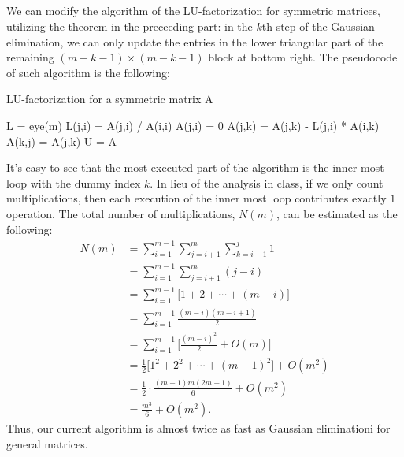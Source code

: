 \documentclass[11pt]{article}
\begin{document}
\subsection{}
We can modify the algorithm of the LU-factorization for symmetric matrices, utilizing the theorem in the preceeding part: in the $k$th step of the Gaussian elimination, we can only update the entries in the lower triangular part of the remaining $(m-k-1)\times(m-k-1)$ block at bottom right. The pseudocode of such algorithm is the following:
\begin{algorithm}[H]
\caption{LU-factorization for a symmetric matrix A}
\begin{algorithmic}
	\STATE L = eye(m)
			\STATE L(j,i) = A(j,i) / A(i,i)
			\STATE A(j,i) = 0
				\STATE A(j,k) = A(j,k) - L(j,i) * A(i,k)
					\STATE A(k,j) = A(j,k)
				\ENDIF
			\ENDFOR
		\ENDFOR
    \ENDFOR
	\STATE U = A
\end{algorithmic}
\end{algorithm}
It's easy to see that the most executed part of the algorithm is the inner most loop with the dummy index $k$. In lieu of the analysis in class, if we only count multiplications, then each execution of the inner most loop contributes exactly $1$ operation. The total number of multiplications, $N(m)$, can be estimated as the following:
\begin{equation}\begin{split} 
N(m) &= \sum_{i=1}^{m-1} \sum_{j=i+1}^m \sum_{k=i+1}^j 1\\
&= \sum_{i=1}^{m-1} \sum_{j=i+1}^m (j-i) \\
&= \sum_{i=1}^{m-1} \Big[ 1 + 2 + \cdots + (m-i) \Big] \\
&= \sum_{i=1}^{m-1} \frac{(m-i)(m-i+1)}2 \\
&= \sum_{i=1}^{m-1} \Big[ \frac{(m-i)^2}2 + O(m) \Big]\\
&= \frac12\Big[ 1^2 + 2^2 + \cdots + (m-1)^2 \Big] + O(m^2) \\
&= \frac12\cdot \frac{(m-1)m(2m-1)}6 + O(m^2)\\
&=\frac{m^3}6 + O(m^2).
\end{split}\nonumber\end{equation} 
Thus, our current algorithm is almost twice as fast as Gaussian eliminationi for general matrices.
\end{document}
